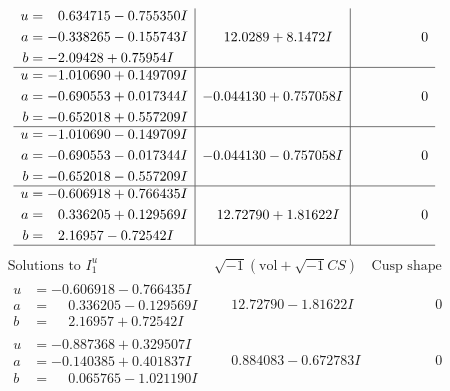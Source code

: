 \documentclass[1p]{elsarticle_modified}
\theoremstyle{definition}
\newcommand{\I}{\sqrt{-1}}
\begin{document}
$$\begin{array}{c|c|c}
\begin{aligned}
u &= \phantom{-}0.634715 - 0.755350 I \\
a &= -0.338265 - 0.155743 I \\
b &= -2.09428 + 0.75954 I\end{aligned}
 & \phantom{-}12.0289 + 8.1472 I & \phantom{-0.000000 } 0 \\ \hline\begin{aligned}
u &= -1.010690 + 0.149709 I \\
a &= -0.690553 + 0.017344 I \\
b &= -0.652018 + 0.557209 I\end{aligned}
 & -0.044130 + 0.757058 I & \phantom{-0.000000 } 0 \\ \hline\begin{aligned}
u &= -1.010690 - 0.149709 I \\
a &= -0.690553 - 0.017344 I \\
b &= -0.652018 - 0.557209 I\end{aligned}
 & -0.044130 - 0.757058 I & \phantom{-0.000000 } 0 \\ \hline\begin{aligned}
u &= -0.606918 + 0.766435 I \\
a &= \phantom{-}0.336205 + 0.129569 I \\
b &= \phantom{-}2.16957 - 0.72542 I\end{aligned}
 & \phantom{-}12.72790 + 1.81622 I & \phantom{-0.000000 } 0\\
 \hline 
 \end{array}$$\newpage$$\begin{array}{c|c|c}  
\text{Solutions to }I^u_{1}& \I (\text{vol} + \sqrt{-1}CS) & \text{Cusp shape}\\
 \hline 
\begin{aligned}
u &= -0.606918 - 0.766435 I \\
a &= \phantom{-}0.336205 - 0.129569 I \\
b &= \phantom{-}2.16957 + 0.72542 I\end{aligned}
 & \phantom{-}12.72790 - 1.81622 I & \phantom{-0.000000 } 0 \\ \hline\begin{aligned}
u &= -0.887368 + 0.329507 I \\
a &= -0.140385 + 0.401837 I \\
b &= \phantom{-}0.065765 - 1.021190 I\end{aligned}
 & \phantom{-}0.884083 - 0.672783 I & \phantom{-0.000000 } 0 \\ \hline\begin{aligned}

\end{aligned}
\end{array}$$
\end{document}
